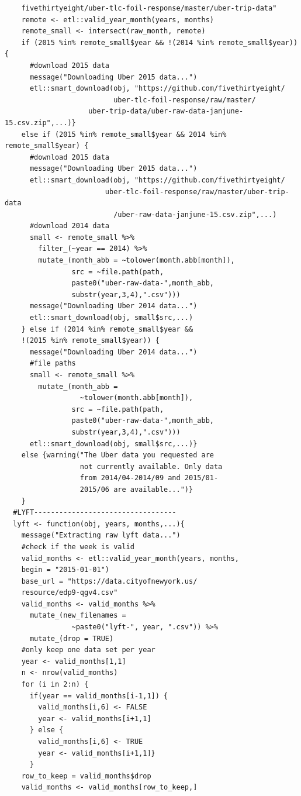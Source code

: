 \documentclass[12pt,twoside]{reedthesis}
\theoremstyle{definition}
\theoremstyle{definition}
\theoremstyle{definition}
\theoremstyle{remark}
\begin{document}
\begin{verbatim}
    fivethirtyeight/uber-tlc-foil-response/master/uber-trip-data"
    remote <- etl::valid_year_month(years, months)
    remote_small <- intersect(raw_month, remote)
    if (2015 %in% remote_small$year && !(2014 %in% remote_small$year)){
      #download 2015 data
      message("Downloading Uber 2015 data...")
      etl::smart_download(obj, "https://github.com/fivethirtyeight/
                          uber-tlc-foil-response/raw/master/
                    uber-trip-data/uber-raw-data-janjune-15.csv.zip",...)}
    else if (2015 %in% remote_small$year && 2014 %in% remote_small$year) {
      #download 2015 data
      message("Downloading Uber 2015 data...")
      etl::smart_download(obj, "https://github.com/fivethirtyeight/
                        uber-tlc-foil-response/raw/master/uber-trip-data
                          /uber-raw-data-janjune-15.csv.zip",...)
      #download 2014 data
      small <- remote_small %>%
        filter_(~year == 2014) %>%
        mutate_(month_abb = ~tolower(month.abb[month]),
                src = ~file.path(path,
                paste0("uber-raw-data-",month_abb,
                substr(year,3,4),".csv")))
      message("Downloading Uber 2014 data...")
      etl::smart_download(obj, small$src,...) 
    } else if (2014 %in% remote_small$year && 
    !(2015 %in% remote_small$year)) {
      message("Downloading Uber 2014 data...")
      #file paths
      small <- remote_small %>%
        mutate_(month_abb = 
                  ~tolower(month.abb[month]),
                src = ~file.path(path,
                paste0("uber-raw-data-",month_abb,
                substr(year,3,4),".csv")))
      etl::smart_download(obj, small$src,...)}
    else {warning("The Uber data you requested are 
                  not currently available. Only data
                  from 2014/04-2014/09 and 2015/01-
                  2015/06 are available...")}
    } 
  #LYFT----------------------------------
  lyft <- function(obj, years, months,...){
    message("Extracting raw lyft data...")
    #check if the week is valid
    valid_months <- etl::valid_year_month(years, months,
    begin = "2015-01-01")
    base_url = "https://data.cityofnewyork.us/
    resource/edp9-qgv4.csv"
    valid_months <- valid_months %>%
      mutate_(new_filenames = 
                ~paste0("lyft-", year, ".csv")) %>%
      mutate_(drop = TRUE)
    #only keep one data set per year
    year <- valid_months[1,1]
    n <- nrow(valid_months)
    for (i in 2:n) {
      if(year == valid_months[i-1,1]) {
        valid_months[i,6] <- FALSE
        year <- valid_months[i+1,1]
      } else {
        valid_months[i,6] <- TRUE
        year <- valid_months[i+1,1]}
      }
    row_to_keep = valid_months$drop
    valid_months <- valid_months[row_to_keep,]
    

\end{verbatim}
\end{document}
